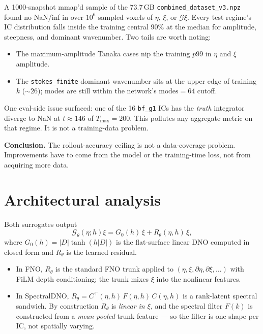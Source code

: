 \documentclass[11pt,letterpaper]{article}
\newcommand{\Gop}{\mathcal{G}}
\begin{document}
A 1000-snapshot mmap'd sample of the 73.7\,GB
\texttt{combined\_dataset\_v3.npz} found no NaN/inf in over $10^{6}$
sampled voxels of $\eta$, $\xi$, or $\Gop\xi$. Every test regime's IC
distribution falls inside the training central 90\% at the median
for amplitude, steepness, and dominant wavenumber. Two tails are worth
noting:
\begin{itemize}[leftmargin=1.3em,itemsep=2pt]
  \item The maximum-amplitude Tanaka cases nip the training $p99$ in
        $\eta$ and $\xi$ amplitude.
  \item The \texttt{stokes\_finite} dominant wavenumber sits at the
        upper edge of training $k$ ($\sim 26$); modes are still within
        the network's $\mathrm{modes}=64$ cutoff.
\end{itemize}
One eval-side issue surfaced: one of the 16 \texttt{bf\_g1} ICs has the
\emph{truth} integrator diverge to NaN at $t\approx 146$ of $T_{\max}=200$.
This pollutes any aggregate metric on that regime. It is not a
training-data problem.

\textbf{Conclusion.} The rollout-accuracy ceiling is not a
data-coverage problem. Improvements have to come from the
model or the training-time loss, not from acquiring more data.

\section{Architectural analysis}

Both surrogates output
\[
  \Gop_\theta(\eta;h)\xi = G_{0}(h)\,\xi + R_{\theta}(\eta,h)\,\xi,
\]
where $G_{0}(h) = |D|\tanh(h|D|)$ is the flat-surface linear DNO
computed in closed form and $R_{\theta}$ is the learned residual.
\begin{itemize}[leftmargin=1.3em,itemsep=2pt]
  \item In FNO, $R_{\theta}$ is the standard FNO trunk applied to
        $(\eta,\xi,\partial\eta,\partial\xi,\dots)$ with FiLM depth
        conditioning; the trunk mixes $\xi$ into the nonlinear
        features.
  \item In SpectralDNO, $R_{\theta} = C^{\!\top}(\eta,h)\,F(\eta,h)\,
        C(\eta,h)$ is a rank-$\mathrm{latent}$ spectral sandwich. By
        construction $R_\theta$ is \emph{linear in $\xi$}, and the
        spectral filter $F(k)$ is constructed from a \emph{mean-pooled}
        trunk feature --- so the filter is one shape per IC, not
        spatially varying.
\end{itemize}
\end{document}
